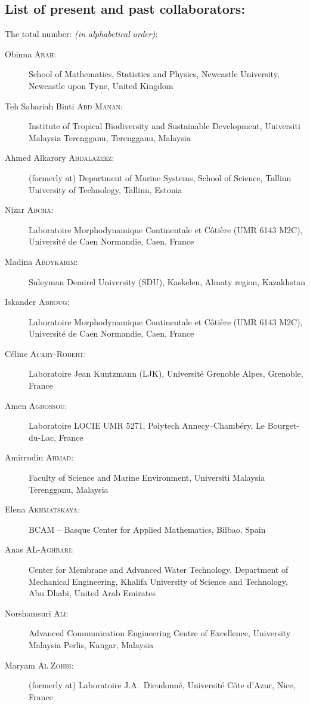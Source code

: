 \vspace*{3mm}\separator
\subsection{List of present and past collaborators:}

The total number: \textbf{\nextitemizecount{}} \emph{(in alphabetical order)}:
\begin{description}
  \item[Obinna \textsc{Abah}:] School of Mathematics, Statistics and Physics, Newcastle University, Newcastle upon Tyne, United Kingdom
  \item[Teh Sabariah Binti \textsc{Abd Manan}:] Institute of Tropical Biodiversity and Sustainable Development, Universiti Malaysia Terengganu, Terengganu, Malaysia
  \item[Ahmed Alkarory \textsc{Abdalazeez}:] (formerly at) Department of Marine Systems, School of Science, Tallinn University of Technology, Tallinn, Estonia
  \item[Nizar \textsc{Abcha}:] Laboratoire Morphodynamique Continentale et C\^oti\`ere (UMR 6143 M2C), Universit\'e de Caen Normandie, Caen, France
  \item[Madina \textsc{Abdykarim}:] Suleyman Demirel University (SDU), Kaskelen, Almaty region, Kazakhstan
  \item[Iskander \textsc{Abroug}:] Laboratoire Morphodynamique Continentale et C\^oti\`ere (UMR 6143 M2C), Universit\'e de Caen Normandie, Caen, France
  \item[C\'eline \textsc{Acary-Robert}:] Laboratoire Jean Kuntzmann (LJK), Universit\'e Grenoble Alpes, Grenoble, France
  \item[Amen \textsc{Agbossou}:] Laboratoire LOCIE UMR 5271, Polytech Annecy--Chamb\'ery, Le Bourget-du-Lac, France
  \item[Amirrudin \textsc{Ahmad}:] Faculty of Science and Marine Environment, Universiti Malaysia Terengganu, Malaysia
  \item[Elena \textsc{Akhmatskaya}:] BCAM -- Basque Center for Applied Mathematics, Bilbao, Spain
  \item[Anas \textsc{AL-Aghbari}:] Center for Membrane and Advanced Water Technology, Department of Mechanical Engineering, Khalifa University of Science and Technology, Abu Dhabi, United Arab Emirates
  \item[Norshamsuri \textsc{Ali}:] Advanced Communication Engineering Centre of Excellence, University Malaysia Perlis, Kangar, Malaysia
  \item[Maryam \textsc{Al Zohbi}:] (formerly at) Laboratoire J.A.~Dieudonn\'e, Universit\'e C\^ote d'Azur, Nice, France

\end{description}
